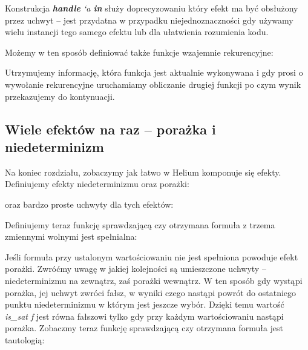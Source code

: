 Konstrukcja \textit{\textbf{handle} `a \textbf{in}} służy doprecyzowaniu który efekt ma być obsłużony przez uchwyt -- jest przydatna w przypadku niejednoznaczności gdy używamy wielu instancji tego samego efektu lub dla ułatwienia rozumienia kodu.

Możemy w ten sposób definiować także funkcje wzajemnie rekurencyjne:



Utrzymujemy informację, która funkcja jest aktualnie wykonywana i gdy prosi o wywołanie rekurencyjne uruchamiamy obliczanie drugiej funkcji po czym wynik przekazujemy do kontynuacji.

% 
% 

\subsection{Wiele efektów na raz -- porażka i niedeterminizm}

Na koniec rozdziału, zobaczymy jak łatwo w Helium komponuje się efekty. Definiujemy efekty niedeterminizmu oraz porażki:



oraz bardzo proste uchwyty dla tych efektów:



Definiujemy teraz funkcję sprawdzającą czy otrzymana formuła z trzema zmiennymi wolnymi jest spełnialna:



Jeśli formuła przy ustalonym wartościowaniu nie jest spełniona powoduje efekt porażki. Zwróćmy uwagę w jakiej kolejności są umieszczone uchwyty -- niedeterminizmu na zewnątrz, zaś porażki wewnątrz. W ten sposób gdy wystąpi porażka, jej uchwyt zwróci fałsz, w wyniki czego nastąpi powrót do ostatniego punktu niedeterminizmu w którym jest jeszcze wybór. Dzięki temu wartość \textit{is\_sat f} jest równa fałszowi tylko gdy przy każdym wartościowaniu nastąpi porażka. Zobaczmy teraz funkcję sprawdzającą czy otrzymana formuła jest tautologią:



